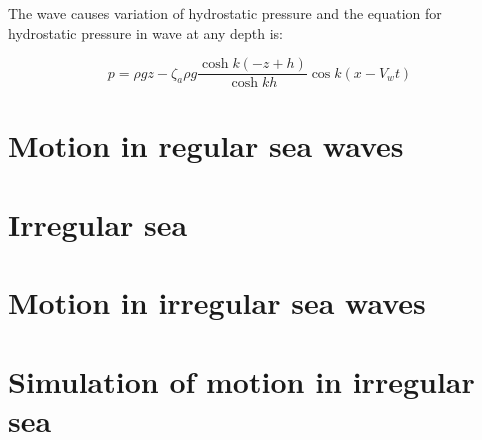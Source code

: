 The wave causes variation of hydrostatic pressure and the equation for
hydrostatic pressure in wave at any depth is:

\begin{equation}
  p = \rho g z - \zeta_a \rho g \frac{\cosh k(-z + h)}{\cosh kh} \cos k(x -
  V_wt)
  \label{eq: RegularWave_2}
\end{equation}

\section{Motion in regular sea waves}

\section{Irregular sea}

\section{Motion in irregular sea waves}

\section{Simulation of motion in irregular sea}


